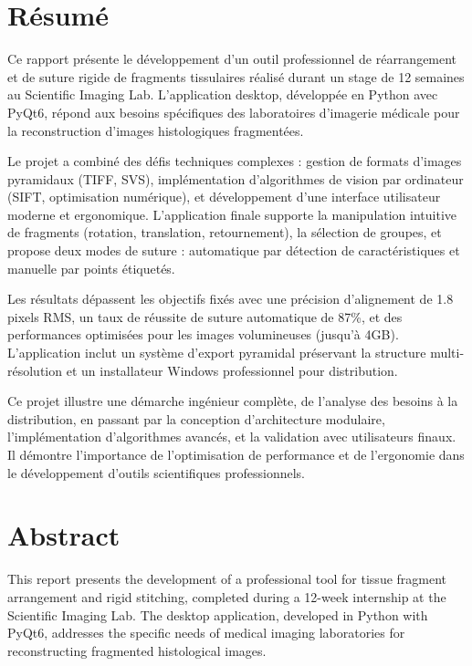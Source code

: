 \documentclass[12pt,a4paper]{article}
\begin{document}
\newpage

\newpage
\thispagestyle{empty}

\vspace*{2cm}

\section*{Résumé}

Ce rapport présente le développement d'un outil professionnel de réarrangement et de suture rigide de fragments tissulaires réalisé durant un stage de 12 semaines au Scientific Imaging Lab. L'application desktop, développée en Python avec PyQt6, répond aux besoins spécifiques des laboratoires d'imagerie médicale pour la reconstruction d'images histologiques fragmentées.

Le projet a combiné des défis techniques complexes : gestion de formats d'images pyramidaux (TIFF, SVS), implémentation d'algorithmes de vision par ordinateur (SIFT, optimisation numérique), et développement d'une interface utilisateur moderne et ergonomique. L'application finale supporte la manipulation intuitive de fragments (rotation, translation, retournement), la sélection de groupes, et propose deux modes de suture : automatique par détection de caractéristiques et manuelle par points étiquetés.

Les résultats dépassent les objectifs fixés avec une précision d'alignement de 1.8 pixels RMS, un taux de réussite de suture automatique de 87\%, et des performances optimisées pour les images volumineuses (jusqu'à 4GB). L'application inclut un système d'export pyramidal préservant la structure multi-résolution et un installateur Windows professionnel pour distribution.

Ce projet illustre une démarche ingénieur complète, de l'analyse des besoins à la distribution, en passant par la conception d'architecture modulaire, l'implémentation d'algorithmes avancés, et la validation avec utilisateurs finaux. Il démontre l'importance de l'optimisation de performance et de l'ergonomie dans le développement d'outils scientifiques professionnels.

\vspace{1cm}

\section*{Abstract}

This report presents the development of a professional tool for tissue fragment arrangement and rigid stitching, completed during a 12-week internship at the Scientific Imaging Lab. The desktop application, developed in Python with PyQt6, addresses the specific needs of medical imaging laboratories for reconstructing fragmented histological images.
\end{document}
